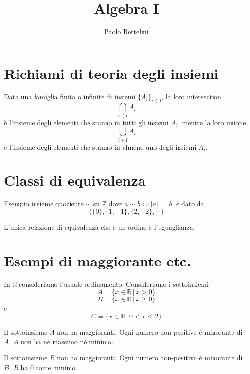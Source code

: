 \documentclass[a4paper]{article}
\title{Algebra I}
\author{Paolo Bettelini}
\date{}
\begin{document}
\maketitle
\tableofcontents

\section{Richiami di teoria degli insiemi}




Data una famiglia finita o infinite di insiemi \({\{A_i\}}_{i\in I}\), la loro intersection
\[
    \bigcap_{i\in I} A_i
\]
è l'insieme degli elementi che stanno in tutti gli insiemi \(A_i\), mentre la loro unione
\[
    \bigcup_{i\in I} A_i
\]
è l'insieme degli elementi che stanno in almeno uno degli insiemi \(A_i\).

\pagebreak 

\section{Classi di equivalenza}

Esempio insieme quoziente \(\sim\) su \(\mathbb{Z}\) dove \(a\sim b \iff |a|=|b|\)
è dato da
\[
    \{
        \{0 \}, \{1,-1 \}, \{2, -2 \}, \cdots    
    \}
\]

L'unica relazione di equivalenza che è un ordine è l'uguaglianza.

\pagebreak 

\section{Esempi di maggiorante etc.}

In \(\mathbb{R}\) consideriamo l'usuale ordinamento. Consideriamo i sottoinsiemi 
\[
    A = \{ x \in \mathbb{R} \,|\, x > 0 \}
\]
\[
    B = \{ x \in \mathbb{R} \,|\, x \geq 0 \}
\]
e
\[
    C = \{ x \in \mathbb{R} \,|\, 0 < x \leq 2 \}
\]

Il sottoinsieme \(A\) non ha maggioranti. Ogni numero non-positivo è minorante di \(A\).
\(A\) non ha nè massimo nè minimo.

Il sottoinsieme \(B\) non ha maggioranti. Ogni numero non-positivo è minorante di \(B\).
\(B\) ha \(0\) come minimo.
\end{document}
